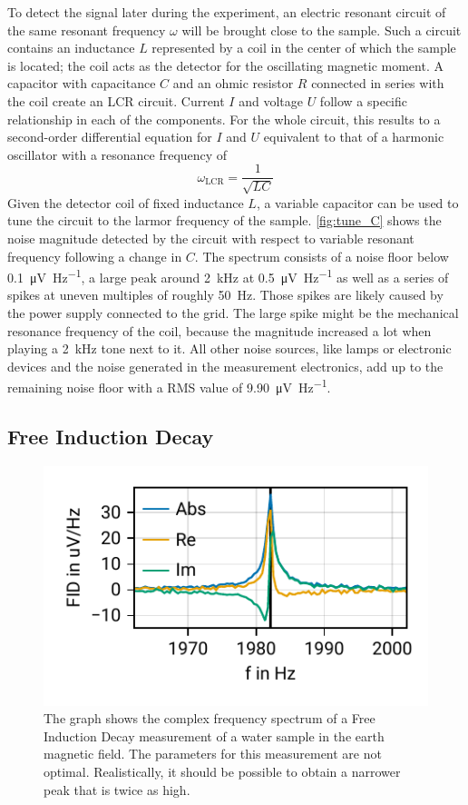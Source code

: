 \documentclass[
    parskip=half, 
    twoside=false,
    twocolumn=true,
    fontsize=11pt,
]{scrarticle}
\begin{document}
To detect the signal later during the experiment, an electric resonant circuit of the same resonant frequency $\omega$ will be brought close to the sample. Such a circuit contains an inductance $L$ represented by a coil in the center of which the sample is located; the coil acts as the detector for the oscillating magnetic moment. A capacitor with capacitance $C$ and an ohmic resistor $R$ connected in series with the coil create an LCR circuit. Current $I$ and voltage $U$ follow a specific relationship in each of the components. For the whole circuit, this results to a second-order differential equation for $I$ and $U$ equivalent to that of a harmonic oscillator with a resonance frequency of
\begin{equation}
    \label{eq:LCR_frequency}
    \omega_{\text{LCR}} = \frac{1}{\sqrt{LC}}
\end{equation}
Given the detector coil of fixed inductance $L$, a variable capacitor can be used to tune the circuit to the larmor frequency of the sample. \autoref{fig:tune_C} shows the noise magnitude detected by the circuit with respect to variable resonant frequency following a change in $C$. The spectrum consists of a noise floor below \SI{0.1}{\micro \volt \per \hertz}, a large peak around \SI{2}{\kilo \hertz} at \SI{0.5}{\micro \volt \per \hertz} as well as a series of spikes at uneven multiples of roughly \SI{50}{\hertz}. Those spikes are likely caused by the power supply connected to the grid. The large spike might be the mechanical resonance frequency of the coil, because the magnitude increased a lot when playing a \SI{2}{\kilo \hertz} tone next to it. All other noise sources, like lamps or electronic devices and the noise generated in the measurement electronics, add up to the remaining noise floor with a RMS value of \SI{9.90}{\micro \volt \per \hertz}.

\subsection{Free Induction Decay}
\begin{figure}
    \centering
    \includegraphics{figures/02 fid.pdf}
    \caption{The graph shows the complex frequency spectrum of a Free Induction Decay measurement of a water sample in the earth magnetic field. The parameters for this measurement are not optimal. Realistically, it should be possible to obtain a narrower peak that is twice as high.}
    \label{fig:FID}
\end{figure}
\end{document}
